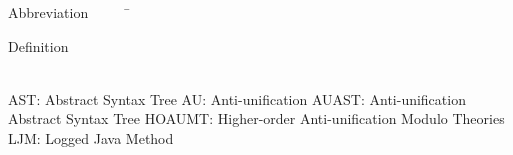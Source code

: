 

\begin{tabbing}
Abbreviation~~~~~\= \ \ \ \ \ \ \ \ \ \ \ \ \ \ \ \ \ \ \ \ \ \ \ \ \ \ \ \ \ \ \ \ \ \ \ \  \parbox{5in}{Definition}\\

\addsymbol \mbox{AST}: {Abstract Syntax Tree}
\addsymbol \mbox{AU}: {Anti-unification}
\addsymbol \mbox{AUAST}: {Anti-unification Abstract Syntax Tree}
\addsymbol \mbox{HOAUMT}: {Higher-order Anti-unification Modulo Theories}
\addsymbol \mbox{LJM}: {Logged Java Method}



\end{tabbing}
